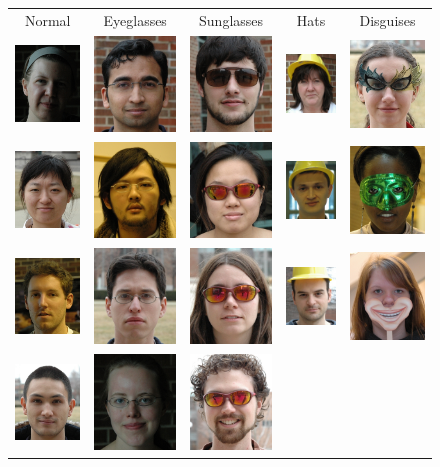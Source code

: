 \begin{figure}
\centering
\newcommand{\imagewidth}{.9in}
\begin{tabular}{ccccc}
Normal & Eyeglasses & Sunglasses & Hats & Disguises \\
\includegraphics[width=\imagewidth]{figures_iccv/real_data_examples/normal_1.jpg} & \includegraphics[width=\imagewidth]{figures_iccv/real_data_examples/glasses_1.jpg} & \includegraphics[width=\imagewidth]{figures_iccv/real_data_examples/sunglasses_1.jpg} & \includegraphics[width=\imagewidth]{figures_iccv/real_data_examples/hats_1.jpg} & \includegraphics[width=\imagewidth]{figures_iccv/real_data_examples/disguise_1.jpg} \\
\includegraphics[width=\imagewidth]{figures_iccv/real_data_examples/normal_2.jpg} & \includegraphics[width=\imagewidth]{figures_iccv/real_data_examples/glasses_2.jpg} & \includegraphics[width=\imagewidth]{figures_iccv/real_data_examples/sunglasses_2.jpg} & \includegraphics[width=\imagewidth]{figures_iccv/real_data_examples/hats_2.jpg} & \includegraphics[width=\imagewidth]{figures_iccv/real_data_examples/disguise_2.jpg} \\
\includegraphics[width=\imagewidth]{figures_iccv/real_data_examples/normal_3.jpg} & \includegraphics[width=\imagewidth]{figures_iccv/real_data_examples/glasses_3.jpg} & \includegraphics[width=\imagewidth]{figures_iccv/real_data_examples/sunglasses_3.jpg} & \includegraphics[width=\imagewidth]{figures_iccv/real_data_examples/hats_3.jpg} & \includegraphics[width=\imagewidth]{figures_iccv/real_data_examples/disguise_3.jpg} \\
\includegraphics[width=\imagewidth]{figures_iccv/real_data_examples/normal_4.jpg} & \includegraphics[width=\imagewidth]{figures_iccv/real_data_examples/glasses_4.jpg} & \includegraphics[width=\imagewidth]{figures_iccv/real_data_examples/sunglasses_4.jpg} & \includegraphics[width=\imagew
\end{tabular}
\end{figure}
